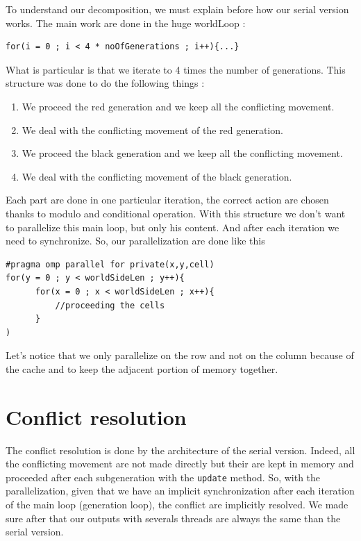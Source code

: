 \documentclass[a4paper,10pt]{article}
\begin{document}
To understand our decomposition, we must explain before how our serial version works.
The main work are done in the huge worldLoop :

\begin{lstlisting}
for(i = 0 ; i < 4 * noOfGenerations ; i++){...}
\end{lstlisting}

What is particular is that we iterate to 4 times the number of generations. This structure was done to do the following things :

\begin{enumerate}
 \item We proceed the red generation and we keep all the conflicting movement.
 \item We deal with the conflicting movement of the red generation.
 \item We proceed the black generation and we keep all the conflicting movement.
 \item We deal with the conflicting movement of the black generation.
\end{enumerate}

Each part are done in one particular iteration, the correct action are chosen thanks to modulo and conditional operation.
With this structure we don't want to parallelize this main loop, but only his content. 
And after each iteration we need to synchronize. So, our parallelization are done like this 

\begin{lstlisting}
#pragma omp parallel for private(x,y,cell)
for(y = 0 ; y < worldSideLen ; y++){
      for(x = 0 ; x < worldSideLen ; x++){
	      //proceeding the cells
      }
)
\end{lstlisting}

Let's notice that we only parallelize on the row and not on the column because of the cache and to keep the adjacent portion of memory
together.

\section*{Conflict resolution}

The conflict resolution is done by the architecture of the serial version. Indeed, all the conflicting movement are not made
directly but their are kept in memory and proceeded after each subgeneration with the \texttt{update} method.
So, with the parallelization, given that we have an implicit synchronization after each iteration of the main loop (generation loop),
the conflict are implicitly resolved. We made sure after that our outputs with severals threads are always the same than the serial version.
\end{document}
